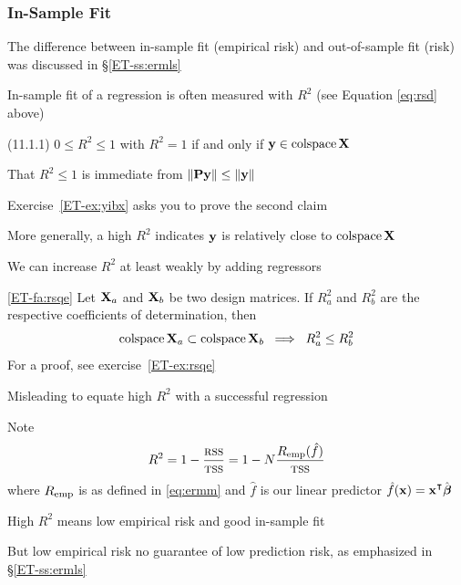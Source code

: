 \begin{frame}\frametitle{In-Sample Fit}

    \vspace{2em}
    The difference between in-sample fit (empirical risk) and
    out-of-sample fit (risk) was discussed in \S\ref{ET-ss:ermls}
    
    In-sample fit of a regression is often measured with $R^2$ (see
    Equation \eqref{eq:rsd} above)
    
    \vspace{.7em}
    \Fact(11.1.1)
    $0 \leq R^2 \leq 1$ with $R^2 = 1$ if and only 
    if ${\mathbf y} \in \operatorname{colspace} \mathbf X$
    
    That $R^2 \leq 1$ is immediate from $\| \mathbf P {\mathbf y} \|
    \leq \| {\mathbf y} \|$
    
    Exercise~\ref{ET-ex:yibx} asks you to prove the second claim
    
    More generally, a
    high $R^2$ indicates ${\mathbf y}$ is relatively close to $\operatorname{colspace} \mathbf X$
    
\end{frame}



\begin{frame}
    
    \vspace{2em}
    We can increase $R^2$ at least weakly by 
    adding regressors
    
    \vspace{.7em}
    \Fact\eqref{ET-fa:rsqe}
         Let $\mathbf X_a$ and $\mathbf X_b$ be two design matrices.
         If $R^2_a$ and $R^2_b$ are the respective
         coefficients of determination, then
         \begin{equation*}
             \operatorname{colspace} \mathbf X_a \subset \operatorname{colspace} \mathbf X_b 
             \; \implies \;
             R^2_a \leq R^2_b
         \end{equation*}
    For a proof, see exercise~\ref{ET-ex:rsqe}
    
\end{frame}

\begin{frame}

    \vspace{.7em}
    Misleading to equate high $R^2$ with a successful regression
    
    Note 
    \begin{equation*}
        R^2 
        = 1 - \frac{\textrm{{\sc rss}}}{ \textrm{{\sc tss}} }
        = 1 - N \frac{R_{{\rm emp}}(\hat f) }{\textrm{{\sc tss}}}
    \end{equation*}
    where $R_{{\rm emp}}$ is as defined in \eqref{eq:ermm} and $\hat f$ is our linear
    predictor $\hat f(\boldx) = \boldx^\T \hboldbeta$
    
    \vspace{.7em}
    High $R^2$ means low
    empirical risk and good in-sample fit
    
    But low empirical risk no guarantee
    of low prediction risk, as emphasized in \S\ref{ET-ss:ermls}
    
\end{frame}

